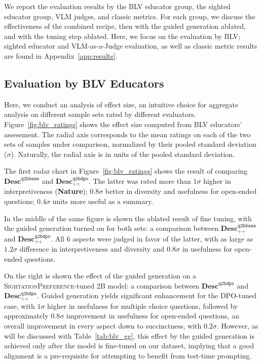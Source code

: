 We report the evaluation results by the BLV educator group, the sighted educator group, VLM judges, and classic metrics. For each group, we discuss the effectiveness of the combined recipe, then with the guided generation ablated, and with the tuning step ablated. Here, we focus on the evaluation by BLV; sighted educator and VLM-as-a-Judge evaluation, as well as classic metric results are found in Appendix~\ref{app:results}.

\subsection{Evaluation by BLV Educators}

Here, we conduct an analysis of effect size, an intuitive choice for aggregate analysis on different sample sets rated by different evaluators. Figure~\ref{fig:blv_ratings} shows the effect size computed from BLV educators' assessment. The radial axis corresponds to the mean ratings on each of the two sets of samples under comparison, normalized by their pooled standard deviation ($\sigma$). Naturally, the radial axis is in units of the pooled standard deviation.

The first radar chart in Figure~\ref{fig:blv_ratings} shows the result of comparing $\textbf{Desc}^\texttt{q2bbase}$ and $\textbf{Desc}^\texttt{q2bdpo}_\texttt{++}$. The latter was rated more than $1\sigma$ higher in interpretiveness (\textbf{Nature}); $0.8\sigma$ better in diversity and usefulness for open-ended questions; $0.4\sigma$ units more useful as a summary.

In the middle of the same figure is shown the ablated result of fine tuning, with the guided generation turned on for both sets: a comparison between $\textbf{Desc}^\texttt{q2bbase}_\texttt{++}$ and $\textbf{Desc}^\texttt{q2bdpo}_\texttt{++}$. All 6 aspects were judged in favor of the latter, with as large as $1.2\sigma$ difference in interpretiveness and diversity and $0.8\sigma$ in usefulness for open-ended questions.

On the right is shown the effect of the guided generation on a \textsc{SightationPreference}-tuned 2B model: a comparison between $\textbf{Desc}^\texttt{q2bdpo}$ and $\textbf{Desc}^\texttt{q2bdpo}_\texttt{++}$. Guided generation yields significant enhancement for the DPO-tuned case, with $1\sigma$ higher in usefulness for multiple choice questions, followed by approximately $0.8\sigma$ improvement in usefulness for open-ended questions, an overall improvement in every aspect down to succinctness, with $0.2\sigma$. However, as will be discussed with Table~\ref{tab:blv_gg}, this effect by the guided generation is achieved only after the model is fine-tuned on our dataset, implying that a good alignment is a pre-requisite for attempting to benefit from test-time prompting.

